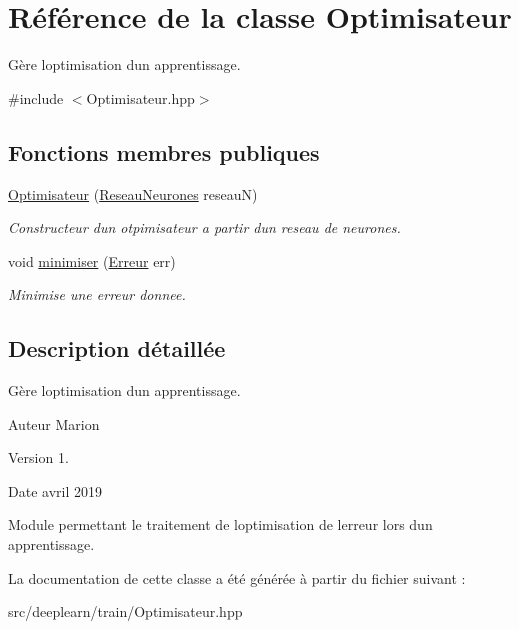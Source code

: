 \hypertarget{classOptimisateur}{}\section{Référence de la classe Optimisateur}
\label{classOptimisateur}


Gère l\textquotesingle{}optimisation d\textquotesingle{}un apprentissage.  




{\ttfamily \#include $<$Optimisateur.\+hpp$>$}

\subsection*{Fonctions membres publiques}
\begin{DoxyCompactItemize}
\item 
\mbox{\label{classOptimisateur_a6add3f8a05881c495701ced64cb7310e}} 
\hyperlink{classOptimisateur_a6add3f8a05881c495701ced64cb7310e}{Optimisateur} (\hyperlink{classReseauNeurones}{Reseau\+Neurones} reseauN)
\begin{DoxyCompactList}\small\item\em Constructeur d\textquotesingle{}un otpimisateur a partir d\textquotesingle{}un reseau de neurones. \end{DoxyCompactList}\item 
\mbox{\label{classOptimisateur_a36f64c4672ec7694a06daad60715bd3a}} 
void \hyperlink{classOptimisateur_a36f64c4672ec7694a06daad60715bd3a}{minimiser} (\hyperlink{classErreur}{Erreur} err)
\begin{DoxyCompactList}\small\item\em Minimise une erreur donnee. \end{DoxyCompactList}\end{DoxyCompactItemize}


\subsection{Description détaillée}
Gère l\textquotesingle{}optimisation d\textquotesingle{}un apprentissage. 

\begin{DoxyAuthor}{Auteur}
Marion 
\end{DoxyAuthor}
\begin{DoxyVersion}{Version}
1. 
\end{DoxyVersion}
\begin{DoxyDate}{Date}
avril 2019
\end{DoxyDate}
Module permettant le traitement de l\textquotesingle{}optimisation de l\textquotesingle{}erreur lors d\textquotesingle{}un apprentissage. 

La documentation de cette classe a été générée à partir du fichier suivant \+:\begin{DoxyCompactItemize}
\item 
src/deeplearn/train/Optimisateur.\+hpp\end{DoxyCompactItemize}
